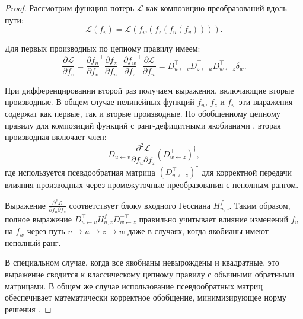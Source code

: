 \documentclass[11pt]{article}
\begin{document}
\begin{proof}
  Рассмотрим функцию потерь $\mathcal{L}$ как композицию преобразований вдоль пути:
  \[
    \mathcal{L}(f_v) = \mathcal{L}(f_w(f_z(f_u(f_v)))).
  \]

  Для первых производных по цепному правилу имеем:
  \[
    \frac{\partial \mathcal{L}}{\partial f_v} = \frac{\partial f_u}{\partial f_v}^\top \frac{\partial
    f_z}{\partial f_u}^\top \frac{\partial f_w}{\partial f_z}^\top \frac{\partial \mathcal{L}}{\partial f_w}
    = D_{u\gets v}^\top D_{z\gets u}^\top D_{w\gets z}^\top \delta_w.
  \]

  При дифференцировании второй раз получаем выражения, включающие вторые производные. В общем случае
  нелинейных функций $f_u$, $f_z$ и $f_w$ эти выражения содержат как первые, так и вторые производные. По
  обобщенному цепному правилу для композиций функций с ранг-дефицитными якобианами \citep[Теорема
  2.8]{ben2003generalized}, вторая производная включает член:
  \[
    D_{u\gets v}^\top \frac{\partial^2 \mathcal{L}}{\partial f_u \partial f_z} (D_{w\gets z}^{\top})^{\dagger},
  \]
  где используется псевдообратная матрица $(D_{w\gets z}^{\top})^{\dagger}$ для корректной передачи влияния
  производных через промежуточные преобразования с неполным рангом.

  Выражение $\frac{\partial^2 \mathcal{L}}{\partial f_u \partial f_z}$ соответствует блоку входного Гессиана
  $H^f_{u,z}$. Таким образом, полное выражение $D_{u\gets v}^\top H^f_{u,z} D_{w\gets z}^{-\top}$ правильно
  учитывает влияние изменений $f_v$ на $f_w$ через путь $v \rightarrow u \rightarrow z \rightarrow w$ даже в
  случаях, когда якобианы имеют неполный ранг.

  В специальном случае, когда все якобианы невырождены и квадратные, это выражение сводится к классическому
  цепному правилу с обычными обратными матрицами. В общем же случае использование псевдообратных матриц
  обеспечивает математически корректное обобщение, минимизирующее норму решения \citep{magnus2019matrix}.
\end{proof}
\end{document}

